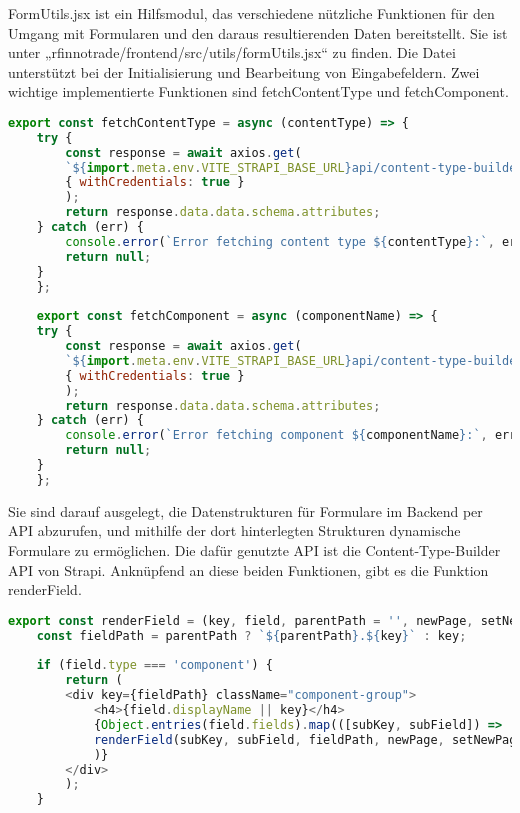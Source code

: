 FormUtils.jsx ist ein Hilfsmodul, das verschiedene nützliche Funktionen für den Umgang mit Formularen und den daraus resultierenden Daten bereitstellt. Sie ist unter „rfinnotrade/frontend/src/utils/formUtils.jsx“ zu finden. Die Datei unterstützt bei der Initialisierung und Bearbeitung von Eingabefeldern.
Zwei wichtige implementierte Funktionen sind fetchContentType und fetchComponent.

\begin{lstlisting}[language=JavaScript, caption={formutils.jsx fetch-Funktionen}, label={lst:formutilsjsxFetchFunktionen}]
export const fetchContentType = async (contentType) => {
    try {
        const response = await axios.get(
        `${import.meta.env.VITE_STRAPI_BASE_URL}api/content-type-builder/content-types/${contentType}?populate=*`,
        { withCredentials: true }
        );
        return response.data.data.schema.attributes;
    } catch (err) {
        console.error(`Error fetching content type ${contentType}:`, err);
        return null;
    }
    };
    
    export const fetchComponent = async (componentName) => {
    try {
        const response = await axios.get(
        `${import.meta.env.VITE_STRAPI_BASE_URL}api/content-type-builder/components/${componentName}?populate=*`,
        { withCredentials: true }
        );
        return response.data.data.schema.attributes;
    } catch (err) {
        console.error(`Error fetching component ${componentName}:`, err);
        return null;
    }
    };
\end{lstlisting}

Sie sind darauf ausgelegt, die Datenstrukturen für Formulare im Backend per API abzurufen, und mithilfe der dort hinterlegten Strukturen dynamische Formulare zu ermöglichen. Die dafür genutzte API ist die Content-Type-Builder API von Strapi.
Anknüpfend an diese beiden Funktionen, gibt es die Funktion renderField.

\begin{lstlisting}[language=JavaScript, caption={formutils.jsx renderField-Funktion}, label={lst:formutilsjsxRenderFieldFunktion}]
export const renderField = (key, field, parentPath = '', newPage, setNewPage, setError, isEditing = false) => {
    const fieldPath = parentPath ? `${parentPath}.${key}` : key;
    
    if (field.type === 'component') {
        return (
        <div key={fieldPath} className="component-group">
            <h4>{field.displayName || key}</h4>
            {Object.entries(field.fields).map(([subKey, subField]) => 
            renderField(subKey, subField, fieldPath, newPage, setNewPage, setError, isEditing)
            )}
        </div>
        );
    }
\end{lstlisting}

